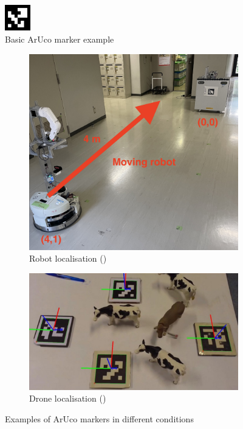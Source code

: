 \documentclass[conference]{IEEEtran}
\begin{document}
\begin{figure}[h]
    \centering
    \includegraphics[width=0.1\textwidth]{images/aruco-marker-1.png}
    \caption{Basic ArUco marker example}
    \label{fig:aruco_marker_basic}
\end{figure}

\begin{figure}[h]
    \centering
    \begin{subfigure}[b]{0.45\textwidth}
        \centering
        \includegraphics[width=\textwidth]{images/aruco-example-1.png}
        \caption{Robot localisation (\cite{AI-Assisted-Drone-Localization})}
        \label{fig:aruco1}
    \end{subfigure}
    \hfill
    \begin{subfigure}[b]{0.45\textwidth}
        \centering
        \includegraphics[width=\textwidth]{images/aruco-example-2.png}
        \caption{Drone localisation (\cite{Nakajima2024AboutAE})}
        \label{fig:aruco2}
    \end{subfigure}
    \caption{Examples of ArUco markers in different conditions}
    \label{fig:aruco_markers}
\end{figure}
\end{document}
